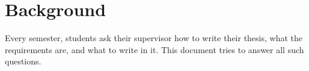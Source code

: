 \chapter{Background}\label{ch:background}

Every semester, students ask their supervisor how to write their thesis,
what the requirements are, and what to write in it.  
This document tries to answer all such questions.

